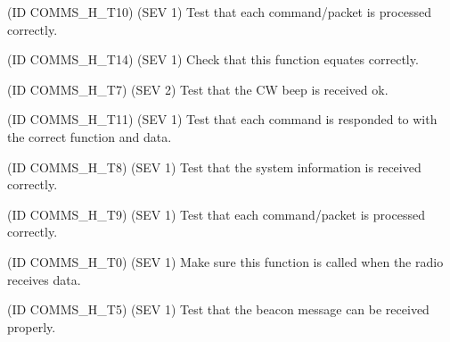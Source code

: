
\begin{DoxyRefList}
\item[\label{test__test000009}%
\Hypertarget{test__test000009}%
Global \hyperlink{communication_8h_a03f49b9aabc52b55893829b7069efc7b}{Communication\+\_\+\+Acknowledge} (uint8\+\_\+t function\+Id, uint8\+\_\+t result)](ID C\+O\+M\+M\+S\+\_\+\+H\+\_\+\+T10) (S\+EV 1) Test that each command/packet is processed correctly. 
\item[\label{test__test000015}%
\Hypertarget{test__test000015}%
Global \hyperlink{communication_8h_abe2c8a0d33c8d6a33fe6fd33c729a5a9}{Communication\+\_\+\+Check\+\_\+\+Opt\+Data\+Len} (uint8\+\_\+t expected, uint8\+\_\+t actual)](ID C\+O\+M\+M\+S\+\_\+\+H\+\_\+\+T14) (S\+EV 1) Check that this function equates correctly. 
\item[\label{test__test000006}%
\Hypertarget{test__test000006}%
Global \hyperlink{communication_8h_aee0a3df78da4459c808120a803c65b61}{Communication\+\_\+\+C\+W\+\_\+\+Beep} (uint32\+\_\+t len)](ID C\+O\+M\+M\+S\+\_\+\+H\+\_\+\+T7) (S\+EV 2) Test that the CW beep is received ok. 
\item[\label{test__test000012}%
\Hypertarget{test__test000012}%
Global \hyperlink{communication_8h_a834526d017e482716c6061772d644d5b}{Communication\+\_\+\+Execute\+\_\+\+Function} (uint8\+\_\+t function\+Id, uint8\+\_\+t $\ast$opt\+Data=N\+U\+LL, size\+\_\+t opt\+Data\+Len=0)](ID C\+O\+M\+M\+S\+\_\+\+H\+\_\+\+T11) (S\+EV 1) Test that each command is responded to with the correct function and data. 
\item[\label{test__test000007}%
\Hypertarget{test__test000007}%
Global \hyperlink{communication_8h_a980dd25e42aaeac1620dc7f9b42859a2}{Communication\+\_\+\+Frame\+\_\+\+Add} (uint8\+\_\+t $\ast$$\ast$buff\+Ptr, T val, const char $\ast$name, uint32\+\_\+t mult, const char $\ast$unit)](ID C\+O\+M\+M\+S\+\_\+\+H\+\_\+\+T8) (S\+EV 1) Test that the system information is received correctly. 
\item[\label{test__test000010}%
\Hypertarget{test__test000010}%
Global \hyperlink{communication_8h_ad5052f7320724c62bfab348ea62c66ce}{Communication\+\_\+\+Process\+\_\+\+Packet} ()](ID C\+O\+M\+M\+S\+\_\+\+H\+\_\+\+T9) (S\+EV 1) Test that each command/packet is processed correctly. 
\item[\label{test__test000001}%
\Hypertarget{test__test000001}%
Global \hyperlink{communication_8h_aaadcd86dea525de318e35078c63b3149}{Communication\+\_\+\+Receive\+\_\+\+Interrupt} ()](ID C\+O\+M\+M\+S\+\_\+\+H\+\_\+\+T0) (S\+EV 1) Make sure this function is called when the radio receives data. 
\item[\label{test__test000005}%
\Hypertarget{test__test000005}%
Global \hyperlink{communication_8h_a5db7440be24bedc9c14f12db46029968}{Communication\+\_\+\+Send\+\_\+\+Morse\+\_\+\+Beacon} (float batt\+Voltage)](ID C\+O\+M\+M\+S\+\_\+\+H\+\_\+\+T5) (S\+EV 1) Test that the beacon message can be received properly. 


\end{DoxyRefList}
